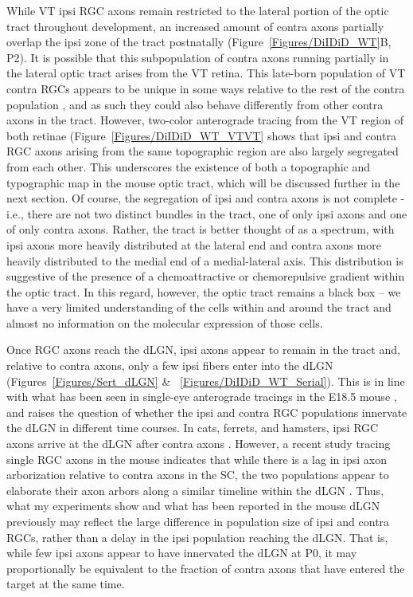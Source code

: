 While VT ipsi RGC axons remain restricted to the lateral portion of the optic tract throughout development, an increased amount of contra axons partially overlap the ipsi zone of the tract postnatally (Figure~\ref{Figures/DiIDiD_WT}B, P2).
It is possible that this subpopulation of contra axons running partially in the lateral optic tract arises from the VT retina.
This late-born population of VT contra RGCs appears to be unique in some ways relative to the rest of the contra population \cite{williams2006role}, and as such they could also behave differently from other contra axons in the tract.
However, two-color anterograde tracing from the VT region of both retinae (Figure~\ref{Figures/DiIDiD_WT_VTVT} shows that ipsi and contra RGC axons arising from the same topographic region are also largely segregated from each other.
This underscores the existence of both a topographic and typographic map in the mouse optic tract, which will be discussed further in the next section.
Of course, the segregation of ipsi and contra axons is not complete - i.e., there are not two distinct bundles in the tract, one of only ipsi axons and one of only contra axons.
Rather, the tract is better thought of as a spectrum, with ipsi axons more heavily distributed at the lateral end and contra axons more heavily distributed to the medial end of a medial-lateral axis.
This distribution is suggestive of the presence of a chemoattractive or chemorepulsive gradient within the optic tract.
In this regard, however, the optic tract remains a black box -- we have a very limited understanding of the cells within and around the tract and almost no information on the molecular expression of those cells.

Once RGC axons reach the dLGN, ipsi axons appear to remain in the tract and, relative to contra axons, only a few ipsi fibers enter into the dLGN (Figures~\ref{Figures/Sert_dLGN} \& ~\ref{Figures/DiIDiD_WT_Serial}).
This is in line with what has been seen in single-eye anterograde tracings in the E18.5 mouse \cite{godement1987study}, and raises the question of whether the ipsi and contra RGC populations innervate the dLGN in different time courses.
In cats, ferrets, and hamsters, ipsi RGC axons arrive at the dLGN after contra axons \cite{shatz1983prenatal,frost1979postnatal,linden1981dorsal}.
However, a recent study tracing single RGC axons in the mouse indicates that while there is a lag in ipsi axon arborization relative to contra axons in the SC, the two populations appear to elaborate their axon arbors along a similar timeline within the dLGN \cite{dhande2011development}.
Thus, what my experiments show and what has been reported in the mouse dLGN previously \cite{godement1987study} may reflect the large difference in population size of ipsi and contra RGCs, rather than a delay in the ipsi population reaching the dLGN.
That is, while few ipsi axons appear to have innervated the dLGN at P0, it may proportionally be equivalent to the fraction of contra axons that have entered the target at the same time.